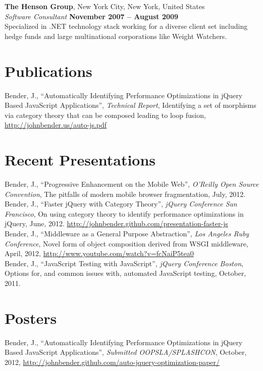 \documentclass[margin,line]{resume}
\begin{document}
\begin{resume}
  \textbf{The Henson Group}, New York City, New York, United States \vspace{1mm}\\
  \textsl{Software Consultant} \hfill \textbf{November 2007 -- August 2009}\\
  Specialized in .NET technology stack working for a diverse client set including hedge funds and large multinational corporations like Weight Watchers.

  \section{\mysidestyle Publications}
  Bender, J., ``Automatically Identifying Performance Optimizations in jQuery Based JavaScript Applications'', \textsl{Technical Report}, Identifying a set of morphisms via category theory that can be composed leading to loop fusion, \url{http://johnbender.us/auto-js.pdf}

  \section{\mysidestyle Recent Presentations}
  Bender, J., ``Progressive Enhancement on the Mobile Web'', \textsl{O'Reilly Open Source Convention}, The pitfalls of modern mobile browser fragmentation, July, 2012.\vspace{2mm}\\
  Bender, J., ``Faster jQuery with Category Theory'', \textsl{jQuery Conference San Francisco}, On using category theory to identify performance optimizations in jQuery, June, 2012. \url{http://johnbender.github.com/presentation-faster-js} \vspace{2mm}\\
  Bender, J., ``Middleware as a General Purpose Abstraction'', \textsl{Los Angeles Ruby Conference}, Novel form of object composition derived from WSGI middleware, April, 2012, \url{http://www.youtube.com/watch?v=fcNaiP5tea0} \vspace{2mm}\\
  Bender, J., ``JavaScript Testing with JavaScript'', \textsl{jQuery Conference Boston}, Options for, and common issues with, automated JavaScript testing, October, 2011.

  \section{\mysidestyle Posters}
  Bender, J., ``Automatically Identifying Performance Optimizations in jQuery Based JavaScript Applications'', \textsl{Submitted OOPSLA/SPLASHCON}, October, 2012, \url{http://johnbender.github.com/auto-jquery-optimization-paper/}



\end{resume}
\end{document}
